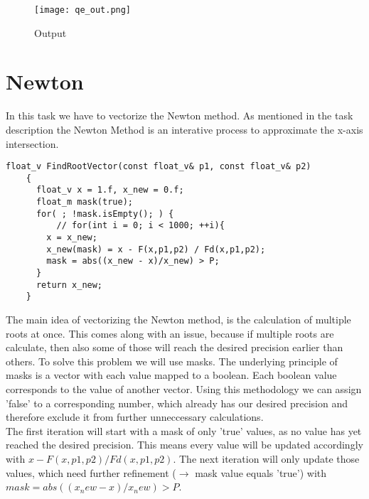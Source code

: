 \documentclass{article}
\begin{document}
\begin{figure}[H]
    \centering
    \texttt{[image: qe\_out.png]} 
    \caption{Output}
    \label{fig:example}
  \end{figure}


\section{Newton}
In this task we have to vectorize the Newton method. As mentioned in the task description
the Newton Method is an interative process to approximate the x-axis intersection. \\[5mm]

\begin{lstlisting}[caption=Newton.cpp]
    float_v FindRootVector(const float_v& p1, const float_v& p2)
    {
      float_v x = 1.f, x_new = 0.f;
      float_m mask(true);
      for( ; !mask.isEmpty(); ) {
          // for(int i = 0; i < 1000; ++i){ 
        x = x_new;
        x_new(mask) = x - F(x,p1,p2) / Fd(x,p1,p2);
        mask = abs((x_new - x)/x_new) > P;
      }
      return x_new;
    }
\end{lstlisting}

\noindent The main idea of vectorizing the Newton method, is the calculation of multiple roots at once.
This comes along with an issue, because if multiple roots are calculate, then also some of those will
reach the desired precision earlier than others. To solve this problem we will use masks.
The underlying principle of masks is a vector with each value mapped to a boolean.
Each boolean value corresponds to the value of another vector.
Using this methodology we can assign 'false' to a corresponding number, which already has our desired precision and therefore
exclude it from further unneccessary calculations.\\

\noindent The first iteration will start with a mask of only 'true' values, as no value has yet reached the desired precision.
This means every value will be updated accordingly with $x - F (x , p1 , p2 ) / Fd (x , p1 , p2 ) $.
The next iteration will only update those values, which need further refinement ($\rightarrow$ mask value equals 'true') with $mask = abs (( x_new - x ) / x_new ) > P $.
\end{document}

